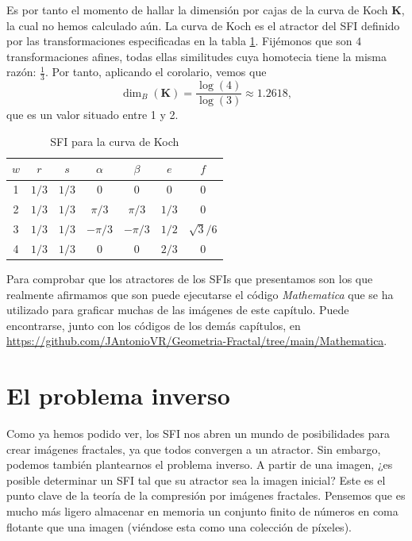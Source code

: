 Es por tanto el momento de hallar la dimensión por cajas de la curva de Koch \textbf{K}, la cual no hemos calculado aún. La curva de Koch es el atractor del SFI definido por las transformaciones especificadas en la tabla \ref{tabla:curva-koch}. Fijémonos que son $4$ transformaciones afines, todas ellas similitudes cuya homotecia tiene la misma razón: $\frac{1}{3}$. Por tanto, aplicando el corolario, vemos que
$$
\dim_B(\mathbf{K})=\dfrac{\log(4)}{\log(3)} \approx 1.2618,
$$
que es un valor situado entre 1 y 2.

\begin{table}[ht]
    \centering
    \begin{tabular}{c|cccccc} \hline
        $w$ & $r$ & $s$ & $\alpha$ & $\beta$ & $e$ & $f$ \\ \hline\hline
    1 & $1/3$ & $1/3$ & 0 & 0 & 0 & 0 \\ \hline
    2 & $1/3$ & $1/3$ & $\pi/3$ & $\pi/3$ & $1/3$ & 0 \\ \hline
    3 & $1/3$ & $1/3$ & $-\pi/3$ & $-\pi/3$ & $1/2$ & $\sqrt{3}/6$ \\ \hline
    4 & $1/3$ & $1/3$ & 0 & 0 & $2/3$ & 0 \\ \hline
    \end{tabular}
    \caption{SFI para la curva de Koch}
    \label{tabla:curva-koch}
\end{table}

Para comprobar que los atractores de los SFIs que presentamos son los que realmente afirmamos que son puede ejecutarse el código \textit{Mathematica} que se ha utilizado para graficar muchas de las imágenes de este capítulo. Puede encontrarse, junto con los códigos de los demás capítulos, en \url{https://github.com/JAntonioVR/Geometria-Fractal/tree/main/Mathematica}.


\section{El problema inverso}
\label{section:problema-inverso}

Como ya hemos podido ver, los SFI nos abren un mundo de posibilidades para crear imágenes fractales, ya que todos convergen a un atractor. Sin embargo, podemos también plantearnos el problema inverso. A partir de una imagen, ¿es posible determinar un SFI tal que su atractor sea la imagen inicial? Este es el punto clave de la teoría de la compresión por imágenes fractales. Pensemos que es mucho más ligero almacenar en memoria un conjunto finito de números en coma flotante que una imagen (viéndose esta como una colección de píxeles).

